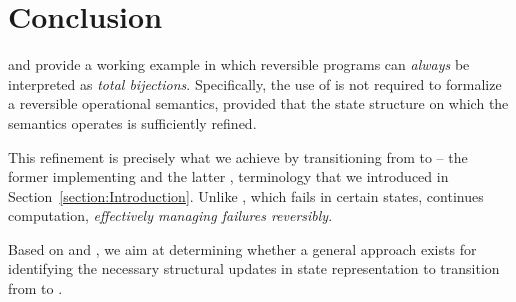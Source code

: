 \section{Conclusion}
\SCORE and \rsemantics provide a working example in which reversible programs can \emph{always} be interpreted as \emph{total bijections}. Specifically, the use of  is not required to formalize a reversible operational semantics, provided that the state structure on which the semantics operates is sufficiently refined. 

This refinement is precisely what we achieve by transitioning from \asemantics to \rsemantics -- the former implementing \PIF and the latter \TIF, terminology that we introduced in Section~\ref{section:Introduction}. Unlike \asemantics, which fails in certain states, \rsemantics continues computation, \emph{effectively managing failures reversibly}. 

Based on \SCORE and \rsemantics, we aim at determining whether a general approach exists for identifying the necessary structural updates in state representation to transition from \PIF to \TIF.